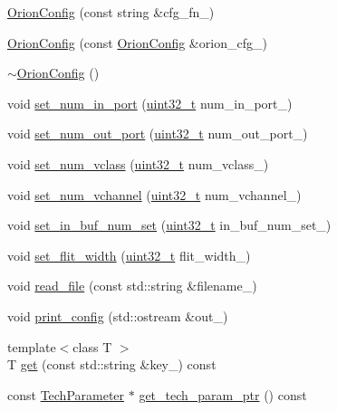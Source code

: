 \begin{DoxyCompactItemize}
\item 
\hyperlink{classOrionConfig_a560f69ec2a5fd4c70a8c6f0e9bf6c2bf}{OrionConfig} (const string \&cfg\_\-fn\_\-)
\item 
\hyperlink{classOrionConfig_a5d07618aac0d14ca386ce86fb8c40889}{OrionConfig} (const \hyperlink{classOrionConfig}{OrionConfig} \&orion\_\-cfg\_\-)
\item 
\hyperlink{classOrionConfig_afb12af8e884185c2bfdb465bb789c718}{$\sim$OrionConfig} ()
\item 
void \hyperlink{classOrionConfig_a88b252fe7abe17472ffddc89edc69b48}{set\_\-num\_\-in\_\-port} (\hyperlink{Type_8hh_a435d1572bf3f880d55459d9805097f62}{uint32\_\-t} num\_\-in\_\-port\_\-)
\item 
void \hyperlink{classOrionConfig_ab67f9bbbe7a8d146511dbbd76fd6e1ac}{set\_\-num\_\-out\_\-port} (\hyperlink{Type_8hh_a435d1572bf3f880d55459d9805097f62}{uint32\_\-t} num\_\-out\_\-port\_\-)
\item 
void \hyperlink{classOrionConfig_a2725040527b398c99c2b1bcb7aeeb19a}{set\_\-num\_\-vclass} (\hyperlink{Type_8hh_a435d1572bf3f880d55459d9805097f62}{uint32\_\-t} num\_\-vclass\_\-)
\item 
void \hyperlink{classOrionConfig_ab71d47cd310c7c9cfaa29fdc98fbe323}{set\_\-num\_\-vchannel} (\hyperlink{Type_8hh_a435d1572bf3f880d55459d9805097f62}{uint32\_\-t} num\_\-vchannel\_\-)
\item 
void \hyperlink{classOrionConfig_ada66b5944babcae7eab2d48832fc4700}{set\_\-in\_\-buf\_\-num\_\-set} (\hyperlink{Type_8hh_a435d1572bf3f880d55459d9805097f62}{uint32\_\-t} in\_\-buf\_\-num\_\-set\_\-)
\item 
void \hyperlink{classOrionConfig_a6a6e29cab117592186f44820cc7b9017}{set\_\-flit\_\-width} (\hyperlink{Type_8hh_a435d1572bf3f880d55459d9805097f62}{uint32\_\-t} flit\_\-width\_\-)
\item 
void \hyperlink{classOrionConfig_ae66e7cfdc93c26b8c84d7eb881574790}{read\_\-file} (const std::string \&filename\_\-)
\item 
void \hyperlink{classOrionConfig_acf691ca359ff52cb80926b35bfe521d4}{print\_\-config} (std::ostream \&out\_\-)
\item 
{\footnotesize template$<$class T $>$ }\\T \hyperlink{classOrionConfig_a70ef6f37761d2fc61b9777d5a8b54f2e}{get} (const std::string \&key\_\-) const 
\item 
const \hyperlink{classTechParameter}{TechParameter} $\ast$ \hyperlink{classOrionConfig_a13bf5badea826f4ab0ef88bf8893ca1e}{get\_\-tech\_\-param\_\-ptr} () const 

\end{DoxyCompactItemize}

